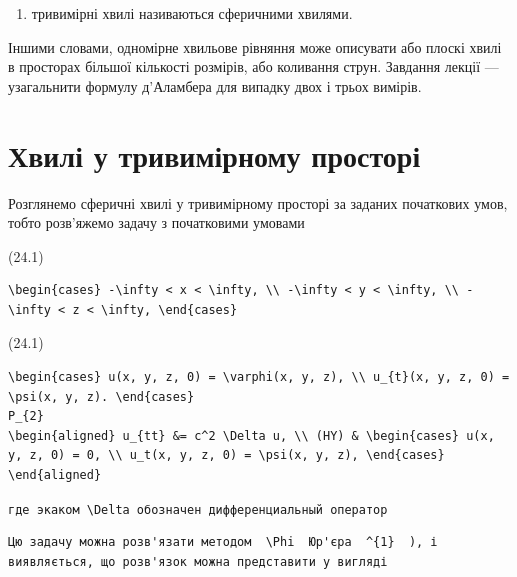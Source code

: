 \documentclass[
  ukrainian,
]{article}
\providecommand{\tightlist}{%
  \setlength{\itemsep}{0pt}\setlength{\parskip}{0pt}}
\begin{document}
\begin{enumerate}
\def\labelenumi{\arabic{enumi})}
\setcounter{enumi}{2}
\tightlist
\item
  тривимірні хвилі називаються сферичними хвилями.
\end{enumerate}

Іншими словами, одномірне хвильове рівняння може описувати або плоскі
хвилі в просторах більшої кількості розмірів, або коливання струн.
Завдання лекції --- узагальнити формулу д'Аламбера для випадку двох і
трьох вимірів.

\section{Хвилі у тривимірному
просторі}\label{ux445ux432ux438ux43bux456-ux443-ux442ux440ux438ux432ux438ux43cux456ux440ux43dux43eux43cux443-ux43fux440ux43eux441ux442ux43eux440ux456}

Розглянемо сферичні хвилі у тривимірному просторі за заданих початкових
умов, тобто розв'яжемо задачу з початковими умовами

(24.1)

\begin{verbatim}
\begin{cases} -\infty < x < \infty, \\ -\infty < y < \infty, \\ -\infty < z < \infty, \end{cases}
\end{verbatim}

(24.1)

\begin{verbatim}
\begin{cases} u(x, y, z, 0) = \varphi(x, y, z), \\ u_{t}(x, y, z, 0) = \psi(x, y, z). \end{cases}
P_{2}
\begin{aligned} u_{tt} &= c^2 \Delta u, \\ (HY) & \begin{cases} u(x, y, z, 0) = 0, \\ u_t(x, y, z, 0) = \psi(x, y, z), \end{cases} \end{aligned}
\end{verbatim}

\texttt{где\ экаком\ \textquotesingle{}\textbackslash{}Delta\textquotesingle{}\ обозначен\ дифференциальный\ оператор}

\begin{verbatim}
Цю задачу можна розв'язати методом  \Phi  Юр'єра  ^{1}  ), і виявляється, що розв'язок можна представити у вигляді
\end{verbatim}
\end{document}
